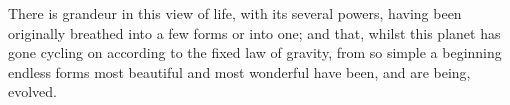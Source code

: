 \documentclass[a4paper, nobind]{templates/ociamthesis}
\begin{document}
\begin{romanpages}

\maketitle




%	

  \dominitoc %

\flushbottom

\tableofcontents



\end{romanpages}

\flushbottom

\minitoc

\newpage

\begin{savequote}
There is grandeur in this view of life, with its several powers, having
been originally breathed into a few forms or into one; and that, whilst
this planet has gone cycling on according to the fixed law of gravity,
from so simple a beginning endless forms most beautiful and most
wonderful have been, and are being, evolved.
\end{savequote}
\end{document}
